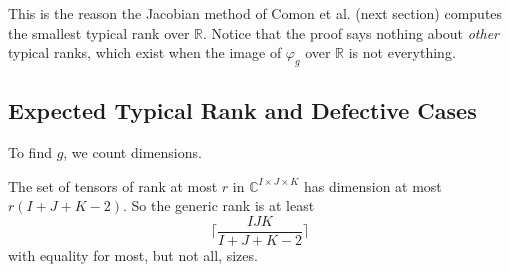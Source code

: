   This is the reason the Jacobian method of Comon et al. (next section) computes the smallest typical rank over $\mathbb{R}$. Notice that the proof says nothing about \textit{other} typical ranks, which exist when the image of $\varphi_g$ over $\mathbb{R}$ is not everything. 

\subsection{Expected Typical Rank and Defective Cases}

  To find $g$, we count dimensions. 

  \begin{lemma}
    \label{lem:expected-generic-rank}
    The set of tensors of rank at most $r$ in $\mathbb{C}^{I \times J \times K}$ has dimension at most $r(I + J + K - 2)$. So the generic rank is at least
    \begin{equation}
      \bigg\lceil \frac{IJK}{I + J + K - 2} \bigg\rceil
    \end{equation}
    with equality for most, but not all, sizes.
  \end{lemma}
